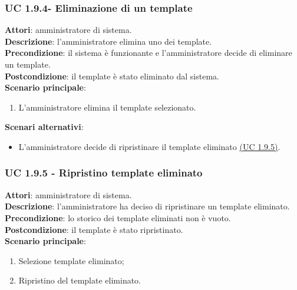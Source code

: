 \subsubsection{UC 1.9.4- Eliminazione di un template}{
	\label{uc1.9.4}
	\textbf{Attori}: amministratore di sistema. \\
	\textbf{Descrizione}: l'amministratore elimina uno dei template. \\
	\textbf{Precondizione}: il sistema è funzionante e l'amministratore decide di eliminare un template.	\\
	\textbf{Postcondizione}: il template è stato eliminato dal sistema.	\\
	\textbf{Scenario principale}:
	\begin{enumerate}
		\item L’amministratore elimina il template selezionato.
	\end{enumerate}
	\textbf{Scenari alternativi}:
	\begin{itemize}
		\item L'amministratore decide di ripristinare il template eliminato \hyperref[uc1.9.5]{(UC 1.9.5)}.
	\end{itemize}
	}
\subsubsection{UC 1.9.5 - Ripristino template eliminato}{
	\label{uc1.9.5}
	\textbf{Attori}: amministratore di sistema. \\
	\textbf{Descrizione}: l'amministratore ha deciso di ripristinare un template eliminato. \\
	\textbf{Precondizione}: lo storico dei template eliminati non è vuoto.	\\
	\textbf{Postcondizione}: il template è stato ripristinato.	\\
	\textbf{Scenario principale}:
	\begin{enumerate}
		\item Selezione template eliminato; 
		\item Ripristino del template eliminato.
	\end{enumerate}
	}

